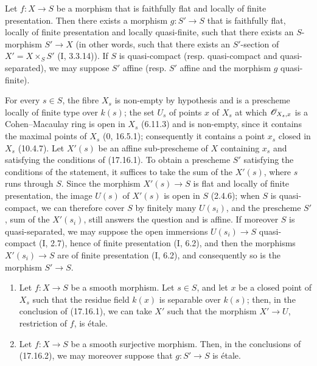 \begin{corollary}[17.16.2]
\label{IV.17.16.2}
Let $f:X\to S$ be a morphism that is faithfully flat and locally of finite presentation. Then there exists a morphism $g:S'\to S$ that is faithfully flat, locally of finite presentation and locally quasi-finite, such that there exists an $S$-morphism $S'\to X$ (in other words, such that there exists an $S'$-section of $X'=X\times_S S'$ (I, 3.3.14)). If $S$ is quasi-compact (resp. quasi-compact and quasi-separated), we may suppose $S'$ affine (resp. $S'$ affine and the morphism $g$ quasi-finite).
\end{corollary}

For every $s\in S$, the fibre $X_s$ is non-empty by hypothesis and is a prescheme locally of finite type over $k(s)$; the set $U_s$ of points $x$ of $X_s$ at which $\mathscr{O}_{X_s,x}$ is a Cohen--Macaulay ring is open in $X_s$ (6.11.3) and is non-empty, since it contains the maximal points of $X_s$ (0, 16.5.1); consequently it contains a point $x_s$ closed in $X_s$ (10.4.7). Let $X'(s)$ be an affine sub-prescheme of $X$ containing $x_s$ and satisfying the conditions of (17.16.1). To obtain a prescheme $S'$ satisfying the conditions of the statement, it suffices to take the sum of the $X'(s)$, where $s$ runs through $S$. Since the morphism $X'(s)\to S$ is flat and locally of finite presentation, the image $U(s)$ of $X'(s)$ is open in $S$ (2.4.6); when $S$ is quasi-compact, we can therefore cover $S$ by finitely many $U(s_i)$, and the prescheme $S'$, sum of the $X'(s_i)$, still answers the question and is affine. If moreover $S$ is quasi-separated, we may suppose the open immersions $U(s_i)\to S$ quasi-compact (I, 2.7), hence of finite presentation (I, 6.2), and then the morphisms $X'(s_i)\to S$ are of finite presentation (I, 6.2), and consequently so is the morphism $S'\to S$.

\begin{corollary}[17.16.3]
\label{IV.17.16.3}
\begin{enumerate}
  \item[(i)] Let $f:X\to S$ be a smooth morphism. Let $s\in S$, and let $x$ be a closed point of $X_s$ such that the residue field $k(x)$ is separable over $k(s)$; then, in the conclusion of (17.16.1), we can take $X'$ such that the morphism $X'\to U$, restriction of $f$, is étale.
  \item[(ii)] Let $f:X\to S$ be a smooth surjective morphism. Then, in the conclusions of (17.16.2), we may moreover suppose that $g:S'\to S$ is étale.
\end{enumerate}
\end{corollary}

